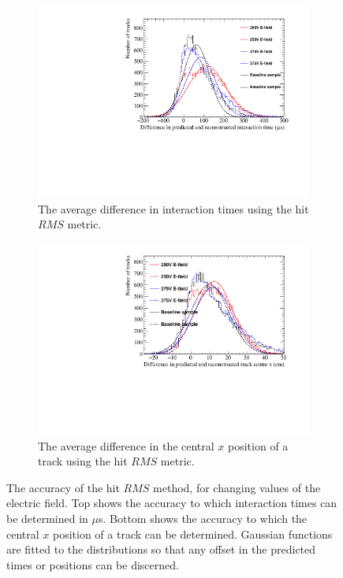 \begin{figure}
  \centering
  \begin{subfigure}{0.6\textwidth}
    \centering
    \includegraphics[width=\textwidth]{Canvas_AvDiff_T_RMS_ElecField}
    \caption{The average difference in interaction times using the hit $RMS$ metric.}
    \label{fig:DiffElecStudy_AvDiffRMS_T}
  \end{subfigure}
  \begin{subfigure}{0.6\textwidth}
    \centering
    \includegraphics[width=\textwidth]{Canvas_AvDiff_X_RMS_ElecField}
    \caption{The average difference in the central $x$ position of a track using the hit $RMS$ metric.}
    \label{fig:DiffElecStudy_AvDiffRMS_X}
  \end{subfigure}
  \caption[Comparing the accuracy of the hit $RMS$ method, as the electric field changes]
          {The accuracy of the hit $RMS$ method, for changing values of the electric field. Top shows the accuracy to which interaction times can be determined in $\mu$s. Bottom shows the accuracy to which the central $x$ position of a track can be determined. Gaussian functions are fitted to the distributions so that any offset in the predicted times or positions can be discerned.}
  \label{fig:DiffElecStudy_AvDiff_RMS}
\end{figure}

